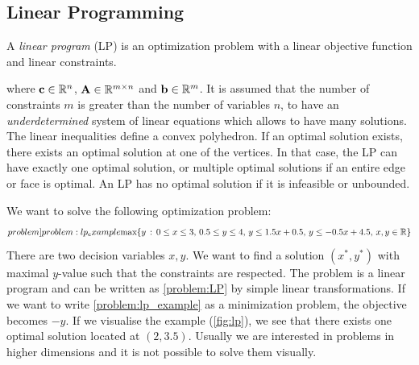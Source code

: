 \subsection{Linear Programming} \label{Section:Linear Programming}
A \textit{linear program} (LP) is an optimization problem with a linear objective function and linear constraints.


where $\bold c \in \mathbb{R}^n$, $ \bold A \in \mathbb{R}^{m \times n}$  and $\bold b \in \mathbb{R}^m$. It is assumed that the number of constraints $m$ is greater than the number of variables $n$, to have an \textit{underdetermined} system of linear equations which allows to have many solutions.  The linear inequalities define a convex polyhedron. If an optimal solution exists, there exists an optimal solution at one of the vertices. In that case, the LP can have exactly one optimal solution, or multiple optimal solutions if an entire edge or face is optimal. An LP has no optimal solution if it is infeasible or unbounded.

We want to solve the following optimization problem:
\begin{equation} \label[problem]{problem:lp_example}
    \text{max} \{y \, : \, 0 \leq x \leq 3 , \, 0.5 \leq y \leq 4, \, y \leq 1.5 x + 0.5, \, y \leq -0.5 x + 4.5, \, x,y \in \mathbb{R} \}
\end{equation} 
There are two decision variables $x, y$. We want to find a solution $(x^*, y^*)$ with maximal $y$-value such that the constraints are respected. The problem is a linear program and can be written as \cref{problem:LP} by simple linear transformations. If we want to write \cref{problem:lp_example} as a minimization problem, the objective becomes $-y$. If we visualise the example (\cref{fig:lp}), we see that there exists one optimal solution located at $(2,3.5)$. Usually we are interested in problems in higher dimensions and it is not possible to solve them visually.

